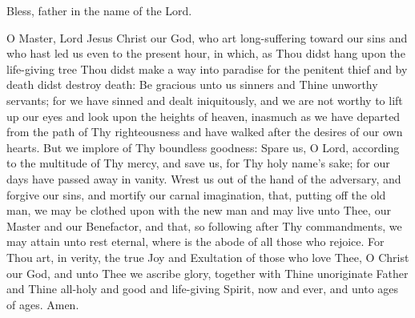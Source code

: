 {%
\begin{reader}
\item \lhmThree
\item \gne
\item 
\item Bless, father in the name of the Lord.
\end{reader}



\begin{maybetwocolumns}
O Master, Lord Jesus Christ our God, who art long-suffering toward our sins
and who hast led us even to the present hour, in which, as Thou didst hang
upon the life-giving tree Thou didst make a way into paradise for the penitent
thief and by death didst destroy death: Be gracious unto us sinners and Thine
unworthy servants; for we have sinned and dealt iniquitously, and we are not
worthy to lift up our eyes and look upon the heights of heaven, inasmuch as
we have departed from the path of Thy righteousness and have walked after the
desires of our own hearts. But we implore of Thy boundless goodness: Spare
us, O Lord, according to the multitude of Thy mercy, and save us, for Thy holy
name’s sake; for our days have passed away in vanity. Wrest us out of the
hand of the adversary, and forgive our sins, and mortify our carnal
imagination, that, putting off the old man, we may be clothed upon with the
new man and may live unto Thee, our Master and our Benefactor, and that, so
following after Thy commandments, we may attain unto rest eternal, where is
the abode of all those who rejoice. For Thou art, in verity, the true Joy and
Exultation of those who love Thee, O Christ our God, and unto Thee we ascribe
glory, together with Thine unoriginate Father and Thine all-holy and good and
life-giving Spirit, now and ever, and unto ages of ages. Amen.
\end{maybetwocolumns}
}

